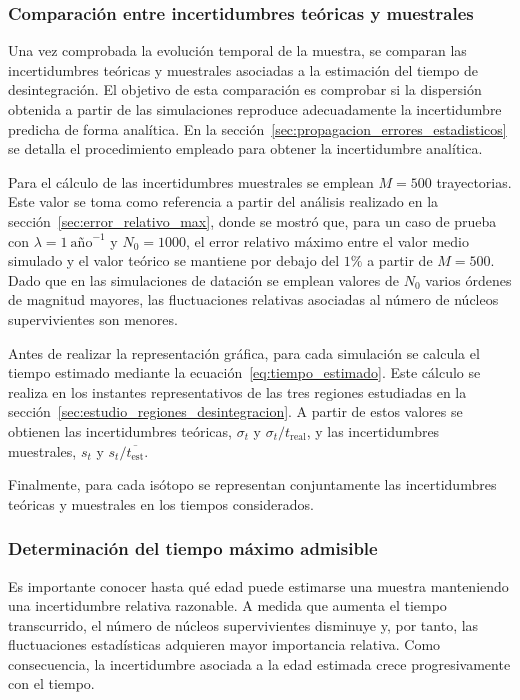 \documentclass[12pt,a4paper]{article}
\begin{document}
\subsubsection{Comparación entre incertidumbres teóricas y muestrales}

Una vez comprobada la evolución temporal de la muestra, se comparan las incertidumbres teóricas y muestrales asociadas a la estimación del tiempo de desintegración. El objetivo de esta comparación es comprobar si la dispersión obtenida a partir de las simulaciones reproduce adecuadamente la incertidumbre predicha de forma analítica. En la sección~\ref{sec:propagacion_errores_estadisticos} se detalla el procedimiento empleado para obtener la incertidumbre analítica.

Para el cálculo de las incertidumbres muestrales se emplean $M=500$ trayectorias. Este valor se toma como referencia a partir del análisis realizado en la sección~\ref{sec:error_relativo_max}, donde se mostró que, para un caso de prueba con $\lambda=1\ \text{año}^{-1}$ y $N_0=1000$, el error relativo máximo entre el valor medio simulado y el valor teórico se mantiene por debajo del $1\%$ a partir de $M=500$. Dado que en las simulaciones de datación se emplean valores de $N_0$ varios órdenes de magnitud mayores, las fluctuaciones relativas asociadas al número de núcleos supervivientes son menores.

Antes de realizar la representación gráfica, para cada simulación se calcula el tiempo estimado mediante la ecuación~\ref{eq:tiempo_estimado}. Este cálculo se realiza en los instantes representativos de las tres regiones estudiadas en la sección~\ref{sec:estudio_regiones_desintegracion}. A partir de estos valores se obtienen las incertidumbres teóricas, $\sigma_t$ y $\sigma_t/t_{\mathrm{real}}$, y las incertidumbres muestrales, $s_t$ y $s_t/\overline{t_{\mathrm{est}}}$.

Finalmente, para cada isótopo se representan conjuntamente las incertidumbres teóricas y muestrales en los tiempos considerados.

\subsubsection{Determinación del tiempo máximo admisible}

Es importante conocer hasta qué edad puede estimarse una muestra manteniendo una incertidumbre relativa razonable. A medida que aumenta el tiempo transcurrido, el número de núcleos supervivientes disminuye y, por tanto, las fluctuaciones estadísticas adquieren mayor importancia relativa. Como consecuencia, la incertidumbre asociada a la edad estimada crece progresivamente con el tiempo.
\end{document}
